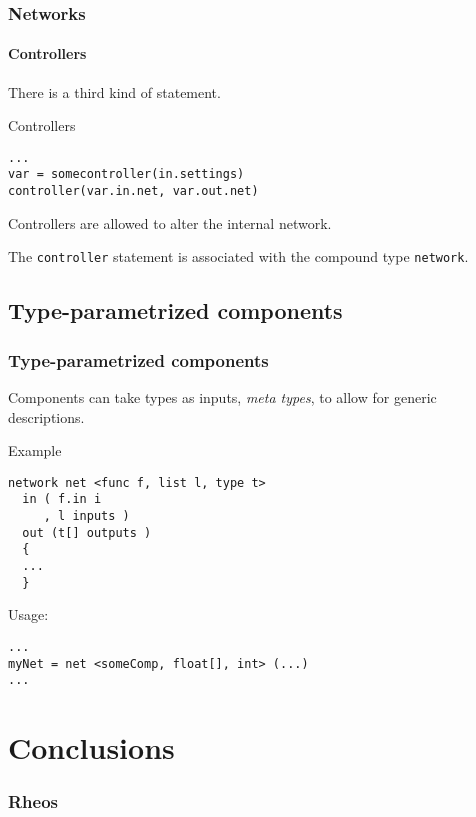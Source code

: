 \documentclass[10pt]{beamer}
\begin{document}
\begin{frame}[fragile]
\frametitle{Networks}
\framesubtitle{Controllers}

There is a third kind of statement.

\pause
\begin{block}{Controllers}
\begin{verbatim}
...
var = somecontroller(in.settings)
controller(var.in.net, var.out.net)
\end{verbatim}
\end{block}

\pause
Controllers are allowed to alter the internal network.
\vspace{10pt}

\pause
The \verb|controller| statement is associated with the compound type
\verb|network|.

\end{frame}


\subsection*{Type-parametrized components}
\begin{frame}[fragile]
\frametitle{Type-parametrized components}

Components can take types as inputs, \emph{meta types}, to allow for
generic descriptions.

\pause
\begin{block}{Example}
\begin{verbatim}
network net <func f, list l, type t>
  in ( f.in i
     , l inputs )
  out (t[] outputs )
  {
  ...
  }
\end{verbatim}
\end{block}

\pause
\begin{block}{Usage:}
\begin{verbatim}
...
myNet = net <someComp, float[], int> (...)
...
\end{verbatim}
\end{block}
\end{frame}

\section{Conclusions}
\begin{frame}
  \frametitle{Rheos}
\end{frame}
\end{document}

